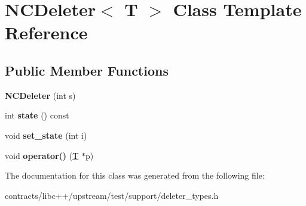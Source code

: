 \hypertarget{class_n_c_deleter}{}\section{N\+C\+Deleter$<$ T $>$ Class Template Reference}
\label{class_n_c_deleter}
\subsection*{Public Member Functions}
\begin{DoxyCompactItemize}
\item 
\mbox{\label{class_n_c_deleter_a48ab3241803d23075125e42e417224a3}} 
{\bfseries N\+C\+Deleter} (int s)
\item 
\mbox{\label{class_n_c_deleter_a4455c1824f4f1d75e530de28870a97d8}} 
int {\bfseries state} () const
\item 
\mbox{\label{class_n_c_deleter_ac2aa8fa02a16b0e2abf7c127a30345cd}} 
void {\bfseries set\+\_\+state} (int i)
\item 
\mbox{\label{class_n_c_deleter_aa952f9ac5ae49cd4547f791361f5de25}} 
void {\bfseries operator()} (\mbox{\hyperlink{struct_t}{T}} $\ast$p)
\end{DoxyCompactItemize}


The documentation for this class was generated from the following file\+:\begin{DoxyCompactItemize}
\item 
contracts/libc++/upstream/test/support/deleter\+\_\+types.\+h\end{DoxyCompactItemize}
